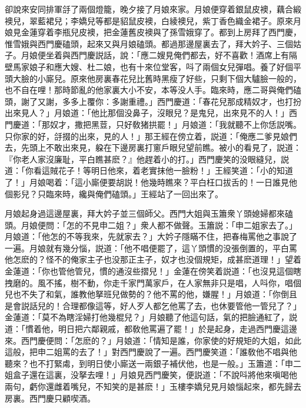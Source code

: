 卻說來安同排軍㧱了兩個燈籠，晚夕接了月娘來家。月娘便穿着銀鼠皮襖，藕合緞襖兒，翠藍裙兒；李嬌兒等都是貂鼠皮襖，白綾襖兒，紫丁香色織金裙子。原來月娘見金蓮穿着李瓶兒皮襖，把金蓮舊皮襖與了孫雪娥穿了。都到上房拜了西門慶，惟雪娥與西門慶磕頭，起來又與月娘磕頭。都過那邊屋裏去了，拜大妗子、三個姑子。月娘便坐着與西門慶説話，說：「應二嫂見俺們都去，好不喜歡！酒席上有隔壁馬家娘子和應大嫂、杜二娘，也有十來位堂客，呌了兩個女兒彈唱。養了好個平頭大臉的小廝兒。原來他房裏春花兒比舊時黑瘦了好些，只剩下個大驢臉一般的，也不自在哩！那時節亂的他家裏大小不安，本等没人手。臨來時，應二哥與俺們磕頭，謝了又謝，多多上覆你：多謝重禮。」西門慶道：「春花兒那成精奴才，也打扮出來見人？」月娘道：「他比那個没鼻子，沒眼兒？是鬼兒，出來見不的人！」西門慶道：「那奴才，撒把黑荳，只好敎猪拱罷！」月娘道：「我就聽不上你恁説嘴。只你家的好，㧱掇的出來，見的人！」那王經在傍立着，説道：「俺應二爹見娘們去，先頭上不敢出來見，躱在下邊房裏打窻戶眼兒望前瞧。被小的看見了，説道：『你老人家沒廉耻，平白瞧甚麽？』他趕着小的打。」西門慶笑的没眼縫兒，説道：「你看這賊花子！等明日他來，着老實抹他一臉粉！」王經笑道：「小的知道了！」月娘喝着：「這小廝便要胡説！他幾時瞧來？平白枉口拔舌的！一日誰見他個影兒？只臨來時，纔與俺們磕頭。」王經站了一回出來了。

月娘起身過這邊屋裏，拜大妗子並三個師父。西門大姐與玉簫衆丫頭媳婦都來磕頭。月娘便問：「怎的不見申二姐？」衆人都不做聲。玉簫説：「申二姐家去了。」月娘道：「他怎的不等我來，先就家去？」大妗子隱瞞不住，把春梅罵他之事說了一遍。月娘就有幾分惱，説道：「他不唱便罷了，這丫頭慣的没張倒置的，平白罵他怎麽的？怪不的俺家主子也没那正主子，奴才也没個規矩，成甚麽道理！」望着金蓮道：「你也管他管兒，慣的通沒些摺兒！」金蓮在傍笑着説道：「也沒見這個瞎拽磨的。風不搖，樹不動，你走千家門萬家戶，在人家無非只是唱，人呌你，唱個兒也不失了和氣，誰教他拏班兒做勢的？他不罵的他，嫌腥！」月娘道：「你倒且是會説話兒的！合理都像這等，好人歹人都乞他罵了去，也休要管他一管兒了？」金蓮道：「莫不為瞎淫婦打他幾棍兒？」月娘聽了他這句話，氣的把臉通紅了，説道：「慣着他，明日把六鄰親戚，都敎他罵遍了罷！」於是起身，走過西門慶這邊來。西門慶便問：「怎麽的？」月娘道：「情知是誰，你家使的好規矩的大姐，如此這般，把申二姐罵的去了！」對西門慶說了一遍。西門慶笑道：「誰敎他不唱與他聽來？也不打緊䖏，到明日使小廝送一兩銀子補伏他，也是一般。」玉簫道：「申二姐盒子還在這裏，没拏去哩！」月娘見西門慶笑，便説道：「不說呌將他來嗔喝他兩句，虧你還雌着嘴兒，不知笑的是甚麽！」玉樓李嬌兒見月娘惱起來，都先歸去房裏。西門慶只顧喫酒。

